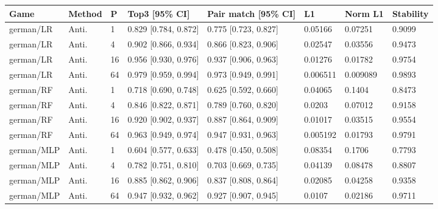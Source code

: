 \begingroup\footnotesize\setlength{\tabcolsep}{3pt}
\begin{tabular}{llllllll}
\toprule
Game & Method & P & Top3 [95\% CI] & Pair match [95\% CI] & L1 & Norm L1 & Stability \\
\midrule
german/LR & Anti. & 1 & 0.829 [0.784, 0.872] & 0.775 [0.723, 0.827] & 0.05166 & 0.07251 & 0.9099 \\
german/LR & Anti. & 4 & 0.902 [0.866, 0.934] & 0.866 [0.823, 0.906] & 0.02547 & 0.03556 & 0.9473 \\
german/LR & Anti. & 16 & 0.956 [0.930, 0.976] & 0.937 [0.906, 0.963] & 0.01276 & 0.01782 & 0.9754 \\
german/LR & Anti. & 64 & 0.979 [0.959, 0.994] & 0.973 [0.949, 0.991] & 0.006511 & 0.009089 & 0.9893 \\
german/RF & Anti. & 1 & 0.718 [0.690, 0.748] & 0.625 [0.592, 0.660] & 0.04065 & 0.1404 & 0.8473 \\
german/RF & Anti. & 4 & 0.846 [0.822, 0.871] & 0.789 [0.760, 0.820] & 0.0203 & 0.07012 & 0.9158 \\
german/RF & Anti. & 16 & 0.920 [0.902, 0.937] & 0.887 [0.864, 0.909] & 0.01017 & 0.03515 & 0.9554 \\
german/RF & Anti. & 64 & 0.963 [0.949, 0.974] & 0.947 [0.931, 0.963] & 0.005192 & 0.01793 & 0.9791 \\
german/MLP & Anti. & 1 & 0.604 [0.577, 0.633] & 0.478 [0.450, 0.508] & 0.08354 & 0.1706 & 0.7793 \\
german/MLP & Anti. & 4 & 0.782 [0.751, 0.810] & 0.703 [0.669, 0.735] & 0.04139 & 0.08478 & 0.8807 \\
german/MLP & Anti. & 16 & 0.885 [0.862, 0.906] & 0.837 [0.808, 0.864] & 0.02085 & 0.04258 & 0.9358 \\
german/MLP & Anti. & 64 & 0.947 [0.932, 0.962] & 0.927 [0.907, 0.945] & 0.0107 & 0.02186 & 0.9711 \\
\bottomrule
\end{tabular}

\endgroup

